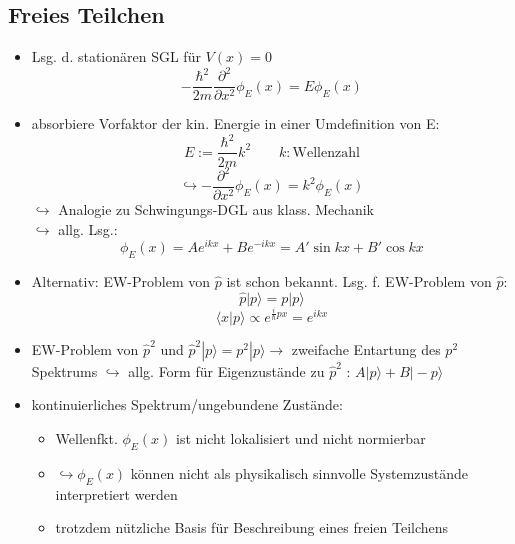 \documentclass[10pt,article,colorback,accentcolor=tud9d]{scrartcl}
\begin{document}
\subsection{Freies Teilchen}
\begin{itemize}
 \item Lsg. d. stationären SGL für $ V(x) = 0 $
    \begin{equation}
        -\frac{\hbar^2}{2m} \frac{\partial^2}{\partial x^2} \phi_E(x) = E\phi_E(x)
    \end{equation}
  \item absorbiere Vorfaktor der kin. Energie in einer Umdefinition von E:
    \begin{equation}
      E := \frac{\hbar^2}{2m}k^2 \quad \quad k: \text{Wellenzahl}
    \end{equation}
    \begin{equation}
      \hookrightarrow -\frac{\partial^2}{\partial x^2} \phi_E(x) = k^2 \phi_E(x)
    \end{equation}
    $ \hookrightarrow $ Analogie zu Schwingungs-DGL aus klass. Mechanik\\
    $ \hookrightarrow $ allg. Lsg.:
    \begin{equation}
     \phi_E(x) = A e^{ikx} + B e^{-ikx} = A'\sin{kx} + B'\cos{kx}
    \end{equation}
  \item Alternativ: EW-Problem von $ \hat{p} $ ist schon bekannt. Lsg. f. EW-Problem von $ \hat{p} $:
    \begin{equation}
     \hat{p} |p\rangle = p |p \rangle
    \end{equation}
    \begin{equation}
      \langle x | p \rangle \propto e^{\frac{i}{\hbar}px} = e^{ikx}
    \end{equation}
  \item EW-Problem von $ \hat{p}^2 $ und $ \hat{p}^2 | p \rangle = p^2 | p \rangle \rightarrow $ zweifache Entartung des $ p^2 $ Spektrums
      $ \hookrightarrow $ allg. Form für Eigenzustände zu $ \hat{p}^2 $ : $ A |p \rangle + B|-p \rangle $
  \item kontinuierliches Spektrum/ungebundene Zustände:
    \begin{itemize}
     \item Wellenfkt. $ \phi_E(x) $ ist nicht lokalisiert und nicht normierbar
     \item $ \hookrightarrow \phi_E(x) $ können nicht als physikalisch sinnvolle Systemzustände interpretiert werden
     \item trotzdem nützliche Basis für Beschreibung eines freien Teilchens
    \end{itemize}
\end{itemize}
\end{document}
